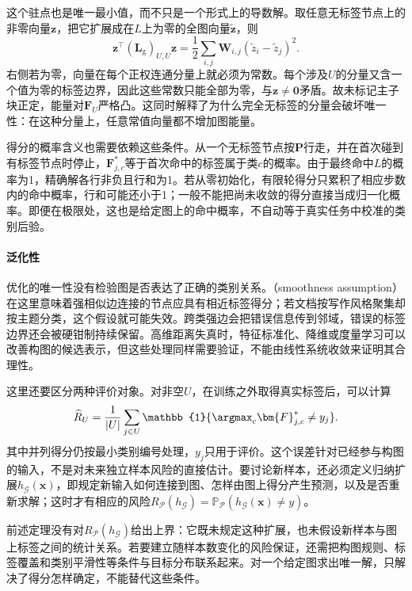 这个驻点也是唯一最小值，而不只是一个形式上的导数解。取任意无标签节点上的非零向量$\bm{z}$，把它扩展成在$L$上为零的全图向量$\widetilde{\bm{z}}$，则
\[
  \bm{z}^{\top}(\bm{L}_{\mathrm{g}})_{U,U}\bm{z}
    =\frac12\sum_{i,j}\bm{W}_{i,j}
      (\widetilde z_i-\widetilde z_j)^2.
\]
右侧若为零，向量在每个正权连通分量上就必须为常数。每个涉及$U$的分量又含一个值为零的标签边界，因此这些常数只能全部为零，与$\bm{z}\ne\bm{0}$矛盾。故未标记主子块正定，能量对$\bm{F}_U$严格凸。这同时解释了为什么完全无标签的分量会破坏唯一性：在这种分量上，任意常值向量都不增加图能量。

得分的概率含义也需要依赖这些条件。从一个无标签节点按$\bm{P}$行走，并在首次碰到有标签节点时停止，$\bm{F}_{j,c}^\ast$等于首次命中的标签属于类$c$的概率。由于最终命中$L$的概率为1，精确解各行非负且行和为1。若从零初始化，有限轮得分只累积了相应步数内的命中概率，行和可能还小于1；一般不能把尚未收敛的得分直接当成归一化概率。即便在极限处，这也是给定图上的命中概率，不自动等于真实任务中校准的类别后验。

\paragraph{泛化性}
优化的唯一性没有检验图是否表达了正确的类别关系。（smoothness assumption）在这里意味着强相似边连接的节点应具有相近标签得分；若文档按写作风格聚集却按主题分类，这个假设就可能失效。跨类强边会把错误信息传到邻域，错误的标签边界还会被硬钳制持续保留。高维距离失真时，特征标准化、降维或度量学习可以改善构图的候选表示，但这些处理同样需要验证，不能由线性系统收敛来证明其合理性。

这里还要区分两种评价对象。对非空$U$，在训练之外取得真实标签后，可以计算
\begin{equation}
  \label{eq:classification-label-propagation-pool-risk}
  \widehat R_U
    =\frac{1}{|U|}\sum_{j\in U}
      \mathbb{1}\{\argmax_c\bm{F}_{j,c}^\ast\ne y_j\}.
\end{equation}
其中并列得分仍按最小类别编号处理，$y_j$只用于评价。这个误差针对已经参与构图的输入，不是对未来独立样本风险的直接估计。要讨论新样本，还必须定义归纳扩展$h_{\mathcal{G}}(\bm{x})$，即规定新输入如何连接到图、怎样由图上得分产生预测，以及是否重新求解；这时才有相应的风险$R_{\mathcal{P}}(h_{\mathcal{G}})=\mathbb{P}_{\mathcal{P}}(h_{\mathcal{G}}(\bm{x})\ne y)$。

前述定理没有对$R_{\mathcal{P}}(h_{\mathcal{G}})$给出上界：它既未规定这种扩展，也未假设新样本与图上标签之间的统计关系。若要建立随样本数变化的风险保证，还需把构图规则、标签覆盖和类别平滑性等条件与目标分布联系起来。对一个给定图求出唯一解，只解决了得分怎样确定，不能替代这些条件。

